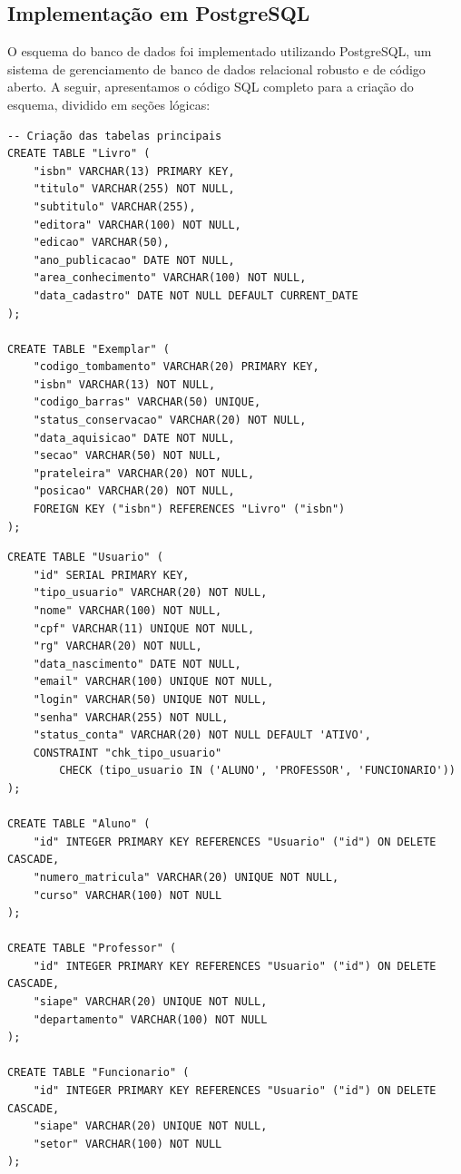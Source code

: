 \documentclass[12pt,a4paper]{article}
\begin{document}
\newpage
\subsection{Implementação em PostgreSQL}
O esquema do banco de dados foi implementado utilizando PostgreSQL, um sistema de gerenciamento de banco de dados relacional robusto e de código aberto. A seguir, apresentamos o código SQL completo para a criação do esquema, dividido em seções lógicas:

\begin{tcolorbox}[title=1. Entidades Principais,size=small]
\begin{verbatim}
-- Criação das tabelas principais
CREATE TABLE "Livro" (
    "isbn" VARCHAR(13) PRIMARY KEY,
    "titulo" VARCHAR(255) NOT NULL,
    "subtitulo" VARCHAR(255),
    "editora" VARCHAR(100) NOT NULL,
    "edicao" VARCHAR(50),
    "ano_publicacao" DATE NOT NULL,
    "area_conhecimento" VARCHAR(100) NOT NULL,
    "data_cadastro" DATE NOT NULL DEFAULT CURRENT_DATE
);

CREATE TABLE "Exemplar" (
    "codigo_tombamento" VARCHAR(20) PRIMARY KEY,
    "isbn" VARCHAR(13) NOT NULL,
    "codigo_barras" VARCHAR(50) UNIQUE,
    "status_conservacao" VARCHAR(20) NOT NULL,
    "data_aquisicao" DATE NOT NULL,
    "secao" VARCHAR(50) NOT NULL,
    "prateleira" VARCHAR(20) NOT NULL,
    "posicao" VARCHAR(20) NOT NULL,
    FOREIGN KEY ("isbn") REFERENCES "Livro" ("isbn")
);
\end{verbatim}
\end{tcolorbox}

\begin{tcolorbox}[title=2. Usuários e Especializações,size=small]
\begin{verbatim}
CREATE TABLE "Usuario" (
    "id" SERIAL PRIMARY KEY,
    "tipo_usuario" VARCHAR(20) NOT NULL,
    "nome" VARCHAR(100) NOT NULL,
    "cpf" VARCHAR(11) UNIQUE NOT NULL,
    "rg" VARCHAR(20) NOT NULL,
    "data_nascimento" DATE NOT NULL,
    "email" VARCHAR(100) UNIQUE NOT NULL,
    "login" VARCHAR(50) UNIQUE NOT NULL,
    "senha" VARCHAR(255) NOT NULL,
    "status_conta" VARCHAR(20) NOT NULL DEFAULT 'ATIVO',
    CONSTRAINT "chk_tipo_usuario"
        CHECK (tipo_usuario IN ('ALUNO', 'PROFESSOR', 'FUNCIONARIO'))
);

CREATE TABLE "Aluno" (
    "id" INTEGER PRIMARY KEY REFERENCES "Usuario" ("id") ON DELETE CASCADE,
    "numero_matricula" VARCHAR(20) UNIQUE NOT NULL,
    "curso" VARCHAR(100) NOT NULL
);

CREATE TABLE "Professor" (
    "id" INTEGER PRIMARY KEY REFERENCES "Usuario" ("id") ON DELETE CASCADE,
    "siape" VARCHAR(20) UNIQUE NOT NULL,
    "departamento" VARCHAR(100) NOT NULL
);

CREATE TABLE "Funcionario" (
    "id" INTEGER PRIMARY KEY REFERENCES "Usuario" ("id") ON DELETE CASCADE,
    "siape" VARCHAR(20) UNIQUE NOT NULL,
    "setor" VARCHAR(100) NOT NULL
);
\end{verbatim}
\end{tcolorbox}
\end{document}
